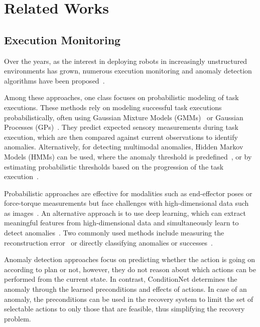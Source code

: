 \section{Related Works}
\subsection{Execution Monitoring}
Over the years, as the interest in deploying robots in increasingly unstructured environments has grown, numerous execution monitoring and anomaly detection algorithms have been proposed~\cite{anomalydetroboticssurv}.

Among these approaches, one class focuses on probabilistic modeling of task executions. These methods rely on modeling successful task executions probabilistically, often using Gaussian Mixture Models (GMMs)~\cite{Eiband2019, willibald2020collaborative} or Gaussian Processes (GPs)~\cite{romeres2019anomaly}. They predict expected sensory measurements during task execution, which are then compared against current observations to identify anomalies. Alternatively, for detecting multimodal anomalies, Hidden Markov Models (HMMs) can be used, where the anomaly threshold is predefined~\cite{azzalini2020hmms}, or by estimating probabilistic thresholds based on the progression of the task execution~\cite{park2019multimodal}.

Probabilistic approaches are effective for modalities such as end-effector poses or force-torque measurements but face challenges with high-dimensional data such as images~\cite{ruan2011regularized}. An alternative approach is to use deep learning, which can extract meaningful features from high-dimensional data and simultaneously learn to detect anomalies~\cite{AnomalyDetSlip, FaluireClassification1, Altan2022CLUEAIAC, FinoNet, InnerMonologe, SuccessVQA}. Two commonly used methods include measuring the reconstruction error~\cite{AnomalyDetSlip} or directly classifying anomalies or successes~\cite{FinoNet, InnerMonologe}.

Anomaly detection approaches focus on predicting whether the action is going on according to plan or not, however, they do not reason about which actions can be performed from the current state. In contrast, ConditionNet determines the anomaly through the learned preconditions and effects of actions. In case of an anomaly, the preconditions can be used in the recovery system to limit the set of selectable actions to only those that are feasible, thus simplifying the recovery problem.

